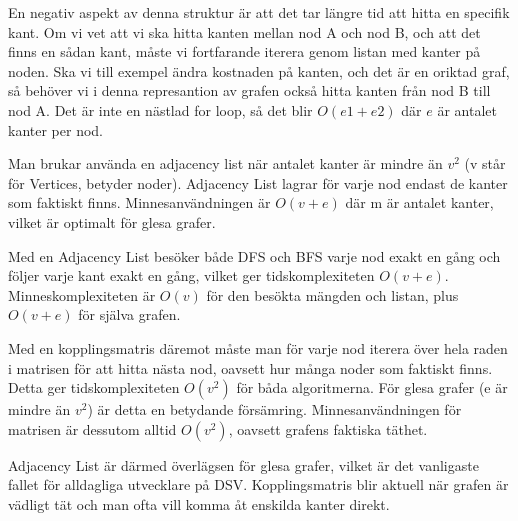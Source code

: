 \documentclass[a5paper,10pt,oneside]{article}
\begin{document}
En negativ aspekt av denna struktur är att det tar längre tid att hitta en specifik kant. Om vi vet att vi ska hitta kanten mellan nod A och nod B, och att
det finns en sådan kant, måste vi fortfarande iterera genom listan med kanter på noden. Ska vi till exempel ändra kostnaden på kanten, och det är en oriktad graf,
så behöver vi i denna represantion av grafen också hitta kanten från nod B till nod A. Det är inte en nästlad for loop, så det blir $O(e1 + e2)$
där $e$ är antalet kanter per nod. 

Man brukar använda en adjacency list när antalet kanter är mindre än $v^2$ \cite{AlgoCademyAdjList}
(v står för Vertices, betyder noder). 
Adjacency List lagrar för varje nod endast de kanter som faktiskt finns. Minnesanvändningen är $O(v+e)$ där
m är antalet kanter, vilket är optimalt för glesa grafer. 




Med en Adjacency List besöker både DFS och BFS varje nod exakt en gång och
följer varje kant exakt en gång, vilket ger tidskomplexiteten $O(v + e)$. 
Minneskomplexiteten är $O(v)$ för
den besökta mängden och listan, plus $O(v + e)$ för själva grafen.

Med en kopplingsmatris däremot måste man för varje nod iterera över hela raden i
matrisen för att hitta nästa nod, oavsett hur många noder som faktiskt finns.
Detta ger tidskomplexiteten $O(v^2)$ för båda algoritmerna. För glesa grafer
(e är mindre än $v^2$) är detta en betydande försämring. Minnesanvändningen för
matrisen är dessutom alltid $O(v^2)$, oavsett grafens faktiska täthet.

Adjacency List är därmed överlägsen för glesa grafer, vilket är det vanligaste fallet för alldagliga utvecklare på DSV.
Kopplingsmatris blir aktuell när grafen är
vädligt tät och man ofta vill komma åt enskilda kanter direkt. 



\end{document}
